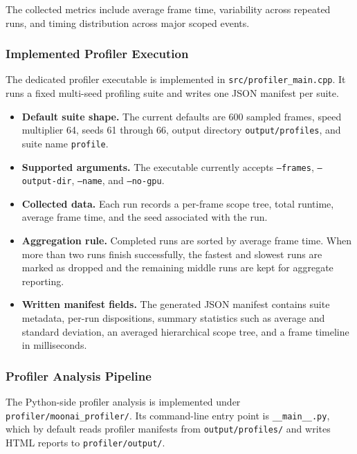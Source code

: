 The collected metrics include average frame time, variability across repeated runs, and
timing distribution across major scoped events.

\subsubsection{Implemented Profiler Execution}

The dedicated profiler executable is implemented in \texttt{src/profiler\_main.cpp}. It
runs a fixed multi-seed profiling suite and writes one JSON manifest per suite.

\begin{itemize}[leftmargin=*]
	\item \textbf{Default suite shape.} The current defaults are 600 sampled frames, speed
	      multiplier 64, seeds 61 through 66, output directory \texttt{output/profiles}, and
	      suite name \texttt{profile}.

	\item \textbf{Supported arguments.} The executable currently accepts \texttt{--frames},
	      \texttt{--output-dir}, \texttt{--name}, and \texttt{--no-gpu}.

	\item \textbf{Collected data.} Each run records a per-frame scope tree, total runtime,
	      average frame time, and the seed associated with the run.

	\item \textbf{Aggregation rule.} Completed runs are sorted by average frame time. When
	      more than two runs finish successfully, the fastest and slowest runs are marked as
	      dropped and the remaining middle runs are kept for aggregate reporting.

	\item \textbf{Written manifest fields.} The generated JSON manifest contains suite
	      metadata, per-run dispositions, summary statistics such as average and standard
	      deviation, an averaged hierarchical scope tree, and a frame timeline in milliseconds.
\end{itemize}

\subsubsection{Profiler Analysis Pipeline}

The Python-side profiler analysis is implemented under \texttt{profiler/moonai\_profiler/}.
Its command-line entry point is \texttt{\_\_main\_\_.py}, which by default reads profiler
manifests from \texttt{output/profiles/} and writes HTML reports to \texttt{profiler/output/}.

